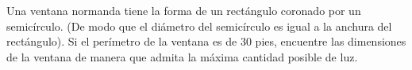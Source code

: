 \item Una ventana normanda tiene la forma de un rectángulo coronado por un semicírculo. (De modo que el diámetro del semicírculo es igual a la anchura del rectángulo). Si el perímetro de la ventana es de 30 pies, encuentre las dimensiones de la ventana de manera que admita la máxima cantidad posible de luz.
